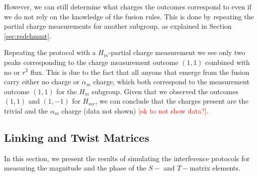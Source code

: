 \documentclass[two column]{article}
\newcommand{\caro}[1]{\textcolor{red}{[#1]}}
\begin{document}
However, we can still determine what charges the outcomes correspond to even if we do not rely on the knowledge of the fusion rules. This is done by repeating the partial charge measurements for another subgroup, as explained in Section \ref{sec:redchmmt}.

Repeating the protocol with a $H_m$-partial charge measurement we see only two peaks corresponding to the charge measurement outcome $(1,1)$ combined with no or $r^2$ flux. This is due to the fact that all anyons that emerge from the fusion carry either no charge or $\alpha_m$ charge, which both correspond to the measurement outcome $(1,1)$ for the $H_m$ subgroup. Given that we observed the outcomes $(1,1)$ and $(1,-1)$ for $H_{mr}$, we can conclude that the charges present are the trivial and the $\alpha_m$ charge (data not shown) \caro{ok to not show data?}.







\subsection{Linking and Twist Matrices}\label{sec:num:intef}

In this section, we present the results of simulating the interference protocols for measuring the magnitude and the phase of the $S-$ and $T-$matrix elements. 
\end{document}
